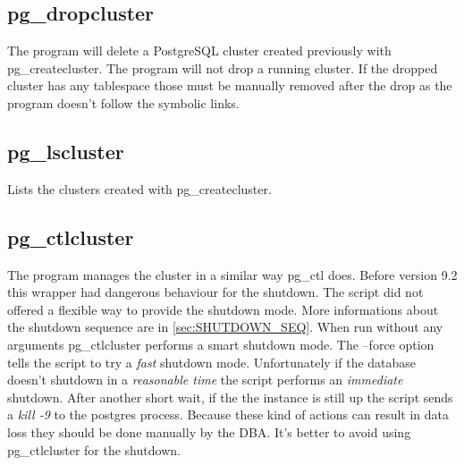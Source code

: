 \subsection{pg\_dropcluster}

The program will delete a PostgreSQL cluster created previously with
pg\_createcluster. The program will not drop a running cluster. If the dropped
cluster has any tablespace those must be manually removed after the drop as the
program doesn't follow the symbolic links.

\subsection{pg\_lscluster}

Lists the clusters created with pg\_createcluster.

\subsection{pg\_ctlcluster}

\label{sub:PGCTLDEB}


The program manages the cluster in a similar way pg\_ctl does. Before version
9.2 this wrapper had dangerous behaviour for the shutdown. The script did not
offered a flexible way to provide the shutdown mode. More informations about
the shutdown sequence are in \ref{sec:SHUTDOWN_SEQ}. When run without any
arguments pg\_ctlcluster performs a smart shutdown mode. The --force option
tells the script to try a \textit{fast} shutdown mode. Unfortunately if the
database doesn't shutdown in a \textit{reasonable time} the script performs an
\textit{immediate} shutdown. After another short wait, if the the instance is
still up the script sends a \textit{kill -9} to the postgres process. Because
these kind of actions can result in data loss they should be done manually by
the DBA. It's better to avoid using pg\_ctlcluster for the shutdown.
